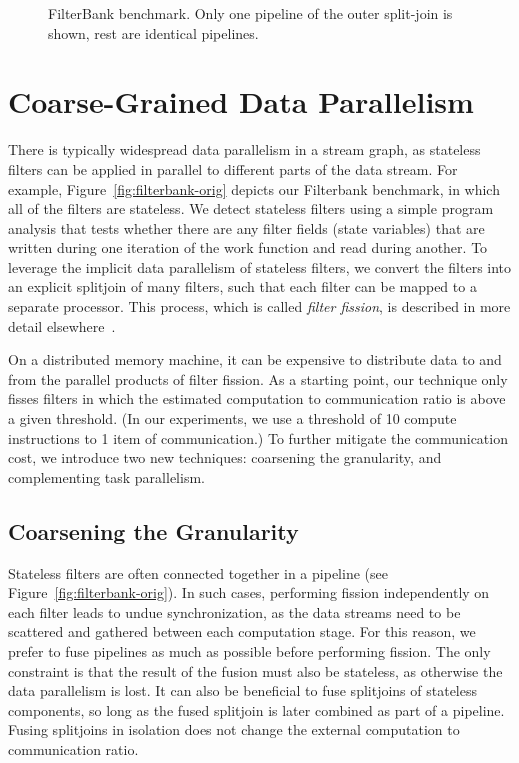 \begin{figure*}[t]
\begin{center}
\end{center}
\caption{FilterBank benchmark. Only one pipeline of the outer split-join is shown, rest are identical pipelines. \label{fig:filterbank}}
\end{figure*}


\section{Coarse-Grained Data Parallelism}

There is typically widespread data parallelism in a stream graph, as
stateless filters can be applied in parallel to different parts of the
data stream.  For example, Figure~\ref{fig:filterbank-orig} depicts
our Filterbank benchmark, in which all of the filters are stateless.
We detect stateless filters using a simple program analysis that tests
whether there are any filter fields (state variables) that are written
during one iteration of the work function and read during another.  To
leverage the implicit data parallelism of stateless filters, we
convert the filters into an explicit splitjoin of many filters, such
that each filter can be mapped to a separate processor.  This process,
which is called {\it filter fission}, is described in more detail
elsewhere~\cite{gordon02asplos}.

On a distributed memory machine, it can be expensive to distribute
data to and from the parallel products of filter fission.  As a
starting point, our technique only fisses filters in which the
estimated computation to communication ratio is above a given
threshold.  (In our experiments, we use a threshold of 10 compute
instructions to 1 item of communication.)  To further mitigate the
communication cost, we introduce two new techniques: coarsening the
granularity, and complementing task parallelism.

\subsection{Coarsening the Granularity}

Stateless filters are often connected together in a pipeline (see
Figure~\ref{fig:filterbank-orig}).  In such cases, performing fission
independently on each filter leads to undue synchronization, as the
data streams need to be scattered and gathered between each
computation stage.  For this reason, we prefer to fuse pipelines as
much as possible before performing fission.  The only constraint is
that the result of the fusion must also be stateless, as otherwise the
data parallelism is lost.  It can also be beneficial to fuse
splitjoins of stateless components, so long as the fused splitjoin is
later combined as part of a pipeline.  Fusing splitjoins in isolation
does not change the external computation to communication ratio.

